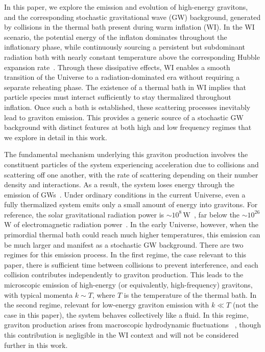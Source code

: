 \documentclass[aps,prd,twocolumn,showpacs,superscriptaddress,nofootinbib,preprintnumbers]{revtex4-2}
\begin{document}
In this paper, we explore the emission and evolution of high-energy gravitons, and the corresponding stochastic gravitational wave (GW) background, generated by collisions in the thermal bath present during warm inflation (WI).
In the WI scenario, the potential energy of the inflaton dominates throughout the inflationary
phase, while continuously sourcing a persistent but subdominant radiation bath with nearly constant temperature above the corresponding Hubble expansion rate~\cite{Berera:1995ie,Berera:1995wh,Berera:1998px}. Through these dissipative effects, WI enables a smooth transition of the Universe to a radiation-dominated era without requiring a separate reheating phase. The existence of a thermal bath in WI implies that particle species must interact sufficiently to stay thermalized throughout inflation. Once such a bath is established,  these scattering processes inevitably lead to graviton emission. This provides a generic source of a stochastic GW background with distinct features at both high and low frequency regimes that we explore in detail in this work.
 
\medskip
The fundamental mechanism underlying this graviton production involves the constituent particles of the system experiencing acceleration due to collisions and scattering off one another, with the rate of scattering depending on their number density and interactions. As a result, the system loses energy through the emission of GWs~\cite{Weinberg:1972kfs}. Under ordinary conditions in the current Universe, even a fully thermalized system emits only a small amount of energy into gravitons. For reference, the solar gravitational radiation power is $\sim 10^8\,\mathrm{W}$~\cite{Weinberg:1965nx,2024arXiv240718297G},
far below the $\sim 10^{26}$ W of electromagnetic radiation power~\cite{IAUInter-DivisionA-GWorkingGrouponNominalUnitsforStellarPlanetaryAstronomy:2015fjh}. In the early Universe, however, when the primordial thermal bath could reach much higher temperatures, this emission can be much larger and manifest as a stochastic GW background. There are two regimes for this emission process. In the first regime, the case relevant to this paper, there is sufficient time between collisions to prevent interference, and each collision contributes independently to graviton production. This leads to the microscopic emission of high-energy (or equivalently, high-frequency) gravitons, with typical momenta $k \sim T$, where $T$ is the temperature of the thermal bath. In the second regime, relevant for low-energy graviton emission with $k \ll T$ (not the case in this paper), the system behaves collectively like a fluid. In this regime, graviton production arises from macroscopic hydrodynamic fluctuations ~\cite{Weinberg:1972kfs, Ghiglieri:2015nfa, Ghiglieri:2020mhm},  though this contribution is negligible in the WI context and will not be considered further in this work. 
\end{document}
